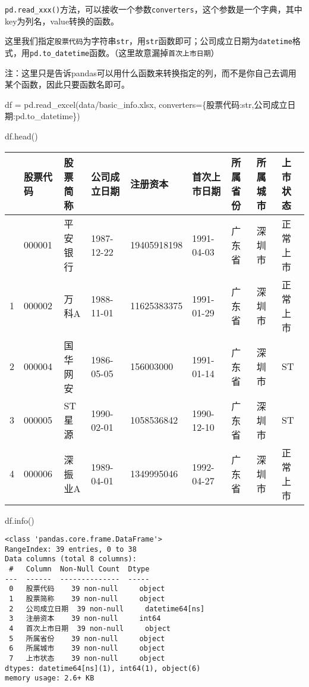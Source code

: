 \documentclass[
  letterpaper,
  DIV=11,
  numbers=noendperiod]{scrreprt}
\newenvironment{Shaded}{\begin{snugshade}}{\end{snugshade}}
\newcommand{\BuiltInTok}[1]{\textcolor[rgb]{0.00,0.23,0.31}{#1}}
\newcommand{\NormalTok}[1]{\textcolor[rgb]{0.00,0.23,0.31}{#1}}
\newcommand{\OperatorTok}[1]{\textcolor[rgb]{0.37,0.37,0.37}{#1}}
\newcommand{\StringTok}[1]{\textcolor[rgb]{0.13,0.47,0.30}{#1}}
\begin{document}
\texttt{pd.read\_xxx()}方法，可以接收一个参数\texttt{converters}，这个参数是一个字典，其中key为列名，value转换的函数。

这里我们指定\texttt{股票代码}为字符串\texttt{str}，用\texttt{str}函数即可；公司成立日期为\texttt{datetime}格式，用\texttt{pd.to\_datetime}函数。（这里故意漏掉\texttt{首次上市日期}）

注：这里只是告诉pandas可以用什么函数来转换指定的列，而不是你自己去调用某个函数，因此只要函数名即可。

\begin{Shaded}
\begin{Highlighting}[]
\NormalTok{df }\OperatorTok{=}\NormalTok{ pd.read\_excel(}\StringTok{\textquotesingle{}data/basic\_info.xlsx\textquotesingle{}}\NormalTok{,}
\NormalTok{                   converters}\OperatorTok{=}\NormalTok{\{}\StringTok{\textquotesingle{}股票代码\textquotesingle{}}\NormalTok{:}\BuiltInTok{str}\NormalTok{,}\StringTok{\textquotesingle{}公司成立日期\textquotesingle{}}\NormalTok{:pd.to\_datetime\})}

\NormalTok{df.head()}
\end{Highlighting}
\end{Shaded}

\begin{longtable}[]{@{}lllllllll@{}}
\toprule\noalign{}
& 股票代码 & 股票简称 & 公司成立日期 & 注册资本 & 首次上市日期 &
所属省份 & 所属城市 & 上市状态 \\
\midrule\noalign{}
\endhead
\bottomrule\noalign{}
\endlastfoot
0 & 000001 & 平安银行 & 1987-12-22 & 19405918198 & 1991-04-03 & 广东省 &
深圳市 & 正常上市 \\
1 & 000002 & 万科A & 1988-11-01 & 11625383375 & 1991-01-29 & 广东省 &
深圳市 & 正常上市 \\
2 & 000004 & 国华网安 & 1986-05-05 & 156003000 & 1991-01-14 & 广东省 &
深圳市 & ST \\
3 & 000005 & ST 星源 & 1990-02-01 & 1058536842 & 1990-12-10 & 广东省 &
深圳市 & ST \\
4 & 000006 & 深振业A & 1989-04-01 & 1349995046 & 1992-04-27 & 广东省 &
深圳市 & 正常上市 \\
\end{longtable}

\begin{Shaded}
\begin{Highlighting}[]
\NormalTok{df.info()}
\end{Highlighting}
\end{Shaded}

\begin{verbatim}
<class 'pandas.core.frame.DataFrame'>
RangeIndex: 39 entries, 0 to 38
Data columns (total 8 columns):
 #   Column  Non-Null Count  Dtype         
---  ------  --------------  -----         
 0   股票代码    39 non-null     object        
 1   股票简称    39 non-null     object        
 2   公司成立日期  39 non-null     datetime64[ns]
 3   注册资本    39 non-null     int64         
 4   首次上市日期  39 non-null     object        
 5   所属省份    39 non-null     object        
 6   所属城市    39 non-null     object        
 7   上市状态    39 non-null     object        
dtypes: datetime64[ns](1), int64(1), object(6)
memory usage: 2.6+ KB
\end{verbatim}
\end{document}
